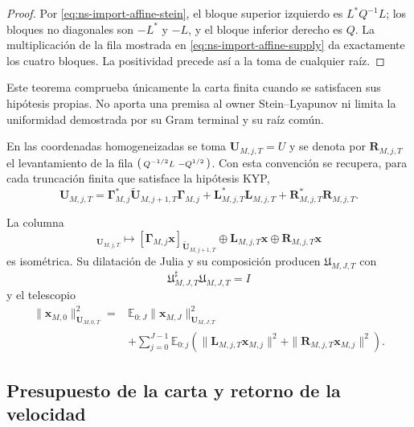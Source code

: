 \begin{proof}
Por \eqref{eq:ns-import-affine-stein}, el bloque superior izquierdo es
\(L^*Q^{-1}L\); los bloques no diagonales son \(-L^*\) y \(-L\), y el bloque
inferior derecho es \(Q\). La multiplicación de la fila mostrada en
\eqref{eq:ns-import-affine-supply} da exactamente los cuatro bloques. La
positividad precede así a la toma de cualquier raíz.
\end{proof}

Este teorema comprueba únicamente la carta finita cuando se satisfacen sus
hipótesis propias. No aporta una premisa al owner Stein--Lyapunov ni limita la
uniformidad demostrada por su Gram terminal y su raíz común.

En las coordenadas homogeneizadas se toma
\(\mathbf U_{M,j,T}=U\) y se denota por
\(\mathbf R_{M,j,T}\) el levantamiento de la fila
\(\begin{psmallmatrix}Q^{-1/2}L&-Q^{1/2}\end{psmallmatrix}\).
Con esta convención se recupera, para cada truncación finita que satisface la
hipótesis KYP,
\[
 \mathbf U_{M,j,T}
 =\mathbf\Gamma_{M,j}^*\widetilde{\mathbf U}_{M,j+1,T}
  \mathbf\Gamma_{M,j}
 +\mathbf L_{M,j,T}^*\mathbf L_{M,j,T}
 +\mathbf R_{M,j,T}^*\mathbf R_{M,j,T}.
\]

La columna
\begin{equation}
 [\mathbf x]_{\mathbf U_{M,j,T}}
 \longmapsto
 [\mathbf\Gamma_{M,j}\mathbf x]_{
  \widetilde{\mathbf U}_{M,j+1,T}}
 \oplus\mathbf L_{M,j,T}\mathbf x
 \oplus\mathbf R_{M,j,T}\mathbf x
 \label{eq:ns-import-local-isometry}
\end{equation}
es isométrica. Su dilatación de Julia y su composición producen
\(\mathfrak U_{M,J,T}\) con
\begin{equation}
 \mathfrak U_{M,J,T}^{\sharp}\mathfrak U_{M,J,T}=I
 \label{eq:ns-import-cascade-isometry}
\end{equation}
y el telescopio
\begin{equation}
 \begin{aligned}
 \|\mathbf x_{M,0}\|_{\mathbf U_{M,0,T}}^2
 ={}&\mathbb E_{0:J}
 \|\mathbf x_{M,J}\|_{\mathbf U_{M,J,T}}^2\\
 &+\sum_{j=0}^{J-1}\mathbb E_{0:j}
 \left(\|\mathbf L_{M,j,T}\mathbf x_{M,j}\|^2
       +\|\mathbf R_{M,j,T}\mathbf x_{M,j}\|^2\right).
 \end{aligned}
 \label{eq:ns-import-stein-telescope}
\end{equation}

\subsection{Presupuesto de la carta y retorno de la velocidad}


